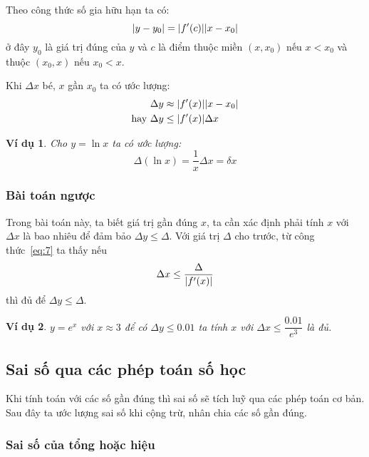\documentclass{book}
\newtheorem{exmp}{Ví dụ}[chapter]
\DeclarePairedDelimiter\abs{\lvert}{\rvert}%
\begin{document}
Theo công thức số gia hữu hạn ta có:
\[\abs{y - y_0} = \abs{f'(c)}\abs{x - x_0}\]
ở đây \(y_0\) là giá trị đúng của \(y\) và \(c\) là điểm thuộc miền \((x, x_0)\)
nếu \(x < x_0\) và thuộc \((x_0, x)\) nếu \(x_0 < x\).

Khi \(\Delta x\) bé, \(x\) gần \(x_0\) ta có ước lượng:
\begin{equation} \label{eq:7}
    \begin{aligned}
                    &\Delta y \approx \abs{f'(x)}\abs{x - x_0} \\
        \text{hay } &\Delta y \leq \abs{f'(x)}\Delta x
    \end{aligned}
\end{equation}

\begin{exmp}
    Cho \(y = \ln{x}\) ta có ước lượng:
    \[\Delta(\ln{x}) = \frac{1}{x} \Delta x = \delta x\]
\end{exmp}

\subsubsection{Bài toán ngược}

Trong bài toán này, ta biết giá trị gần đúng \(x\), ta cần xác định phải tính
\(x\) với \(\Delta x\) là bao nhiêu để đảm bảo \(\Delta y \leq \Delta\). Với giá
trị \(\Delta\) cho trước, từ công thức~\ref{eq:7} ta thấy nếu
\begin{equation} \label{eq:approx_of_relative_error}
    \Delta x \leq \frac{\Delta}{\abs{f'(x)}}
\end{equation}
thì đủ để \(\Delta y \leq \Delta\).

\begin{exmp}
    \(y = e^x\) với \(x \approx 3\) để có \(\Delta y \leq \num{0.01}\) ta tính
    \(x\) với \(\Delta x \leq \dfrac{\num{0.01}}{e^3}\) là đủ.
\end{exmp}

\subsection{Sai số qua các phép toán số học}

Khi tính toán với các số gần đúng thì sai số sẽ tích luỹ qua các phép toán cơ
bản. Sau đây ta ước lượng sai số khi cộng trừ, nhân chia các số gần đúng.

\subsubsection{Sai số của tổng hoặc hiệu}
\end{document}
